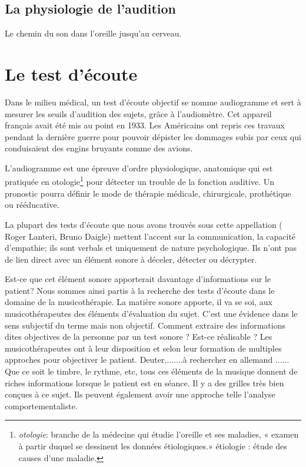\section{La physiologie de l'audition}
Le chemin du son dans l'oreille jusqu'au cerveau.


\chapter{Le test d'écoute}
Dans le milieu médical, un test d'écoute objectif se nomme audiogramme et
sert à mesurer les seuils d'audition des sujets, grâce à l'audiomètre. Cet 
appareil français avait été mis au point en 1933. Les Américains
ont repris ces travaux pendant la dernière guerre pour pouvoir dépister
les dommages subis par ceux qui conduisaient des engins bruyants comme
des avions.

L'audiogramme est une épreuve d'ordre physiologique, anatomique qui
est pratiquée en otologie\footnote{\emph{otologie}: branche de la médecine
  qui étudie l'oreille et ses maladies, « examen à partir duquel se
  dessinent les données étiologiques.» étiologie : étude des causes
  d'une maladie.} pour détecter un trouble de la fonction auditive. Un pronostic pourra définir le mode de thérapie
médicale, chirurgicale, prothétique ou rééducative.


La plupart des tests d'écoute que nous avons trouvés sous cette appellation
( Roger Lanteri, Bruno Daigle)
mettent l'accent sur la communication, la capacité d'empathie; ils sont verbals et uniquement  de nature  psychologique. Ils n'ont pas de lien direct avec un élément sonore à déceler,  détecter ou décrypter. 

Est-ce que cet élément sonore apporterait davantage d'informations sur
le patient? Nous sommes ainsi partis à la recherche  des tests d'écoute dans le domaine de la musicothérapie.
La matière sonore apporte, il va se soi, aux musicothérapeutes des éléments
 d'évaluation du sujet. C'est une évidence dans le sens subjectif du terme mais non objectif. Comment extraire des informations dites objectives de la personne par un test sonore ? Est-ce réalisable ?
 Les musicothérapeutes ont à leur disposition et selon leur formation de multiples approches pour objectiver le patient. Deuter........à rechercher en allemand ...... Que ce soit le timbre, le rythme, etc, tous ces éléments de la musique donnent de riches informations lorsque le patient est en séance. Il y a des grilles très bien conçues à ce sujet.
 Ils peuvent également avoir une approche telle l'analyse comportementaliste. 
 
